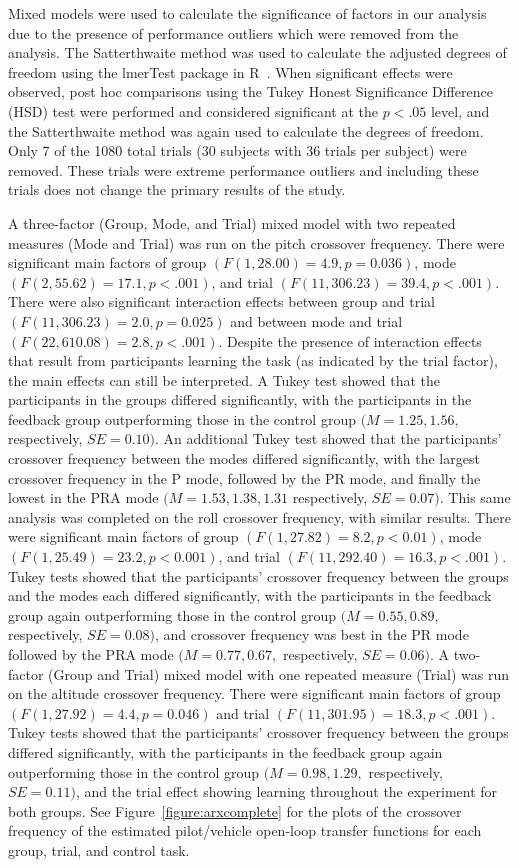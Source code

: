 Mixed models were used to calculate the significance of factors in our analysis due to the presence of performance outliers which were removed from the analysis.
The Satterthwaite method was used to calculate the adjusted degrees of freedom using the lmerTest package in R~\citep{RN53}.
When significant effects were observed, post hoc comparisons using the Tukey Honest Significance Difference (HSD) test were performed and considered significant at the $p < .05$ level, and the Satterthwaite method was again used to calculate the degrees of freedom.
Only 7 of the 1080 total trials (30 subjects with 36 trials per subject) were removed.
These trials were extreme performance outliers and including these trials does not change the primary results of the study.

A three-factor (Group, Mode, and Trial) mixed model with two repeated measures (Mode and Trial) was run on the pitch crossover frequency.
There were significant main factors of group $(F(1, 28.00) = 4.9, p = 0.036)$, mode $(F(2, 55.62) = 17.1, p < .001)$, and trial $(F(11, 306.23) = 39.4, p < .001)$.
There were also significant interaction effects between group and trial $(F(11, 306.23) = 2.0, p = 0.025)$ and between mode and trial $(F(22, 610.08) = 2.8, p < .001)$.
Despite the presence of interaction effects that result from participants learning the task (as indicated by the trial factor), the main effects can still be interpreted.
A Tukey test showed that the participants in the groups differed significantly, with the participants in the feedback group outperforming those in the control group $(M = 1.25, 1.56,$ respectively, $SE = 0.10)$.
An additional Tukey test showed that the participants' crossover frequency between the modes differed significantly, with the largest crossover frequency in the P mode, followed by the PR mode, and finally the lowest in the PRA mode $(M = 1.53, 1.38, 1.31$ respectively, $SE = 0.07)$.
This same analysis was completed on the roll crossover frequency, with similar results.
There were significant main factors of group $(F(1, 27.82) = 8.2, p < 0.01)$, mode $(F(1, 25.49) = 23.2, p < 0.001)$, and trial $(F(11, 292.40) = 16.3, p < .001)$.
Tukey tests showed that the participants' crossover frequency between the groups and the modes each differed significantly, with the participants in the feedback group again outperforming those in the control group $(M = 0.55, 0.89,$ respectively, $SE = 0.08)$, and crossover frequency was best in the PR mode followed by the PRA mode $(M = 0.77, 0.67,$ respectively, $SE = 0.06)$.
A two-factor (Group and Trial) mixed model with one repeated measure (Trial) was run on the altitude crossover frequency.
There were significant main factors of group $(F(1, 27.92) = 4.4, p = 0.046)$ and trial $(F(11, 301.95) = 18.3, p < .001)$.
Tukey tests showed that the participants' crossover frequency between the groups differed significantly, with the participants in the feedback group again outperforming those in the control group $(M = 0.98, 1.29,$ respectively, $SE = 0.11)$, and the trial effect showing learning throughout the experiment for both groups.
See Figure~\ref{figure:arxcomplete} for the plots of the crossover frequency of the estimated pilot/vehicle open-loop transfer functions for each group, trial, and control task.

